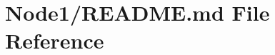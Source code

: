 \hypertarget{_r_e_a_d_m_e_8md}{}\section{Node1/\+R\+E\+A\+D\+ME.md File Reference}
\label{_r_e_a_d_m_e_8md}
